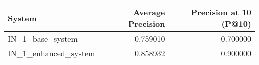 \begin{tabular}{lrr}
\toprule
System & Average Precision & Precision at 10 (P@10) \\
\midrule
IN_1_base_system & 0.759010 & 0.700000 \\
IN_1_enhanced_system & 0.858932 & 0.900000 \\
\bottomrule
\end{tabular}
